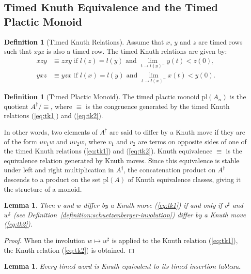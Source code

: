 \documentclass[10pt]{amsproc}
\newtheorem{lemma}[theorem]{Lemma}
\theoremstyle{definition}
\newtheorem{definition}[theorem]{Definition}
\theoremstyle{remark}
\newcommand{\pl}{\mathrm{pl}}
\begin{document}
\subsection{Timed Knuth Equivalence and the Timed Plactic Monoid}
\begin{definition}
  [Timed Knuth Relations]
  \label{sec:timed-knuth-equiv}
  Assume that $x$, $y$ and $z$ are timed rows such that $xyz$ is also a timed row.
  The timed Knuth relations are given by:
  \begin{align}
    \tag{$\kappa_1$}
    \label{eq:tk1}
    xzy & \equiv zxy \text{ if } l(z)=l(y) \text{ and } \lim_{t\to l(y)^-} y(t)<z(0),\\
    \tag{$\kappa_2$}
    \label{eq:tk2}
    yxz & \equiv yzx\text{ if } l(x)=l(y) \text{ and } \lim_{t\to l(x)^-} x(t)<y(0).
  \end{align}
\end{definition}
\begin{definition}
  [Timed Plactic Monoid]
  \label{definition:timed-plactic-monoid}
  The timed plactic monoid $\pl(A_n)$ is the quotient $A^\dagger/\equiv$, where $\equiv$ is the congruence generated by the timed Knuth relations (\ref{eq:tk1}) and (\ref{eq:tk2}).
\end{definition}
In other words, two elements of $A^\dagger$ are said to differ by a Knuth move if they are of the form $uv_1w$ and $uv_2w$, where $v_1$ and $v_2$ are terms on opposite sides of one of the timed Knuth relations (\ref{eq:tk1}) and (\ref{eq:tk2}).
Knuth equivalence $\equiv$ is the equivalence relation generated by Knuth moves.
Since this equivalence is stable under left and right multiplication in $A^\dagger$, the concatenation product on $A^\dagger$ descends to a product on the set $\pl(A)$ of Knuth equivalence classes, giving it the structure of a monoid.
\begin{lemma}
  \label{lemma:sharp-moves}
  Then $v$ and $w$ differ by a Knuth move (\ref{eq:tk1}) if and only if $v^\sharp$ and $w^\sharp$ (see Definition~\ref{definition:schuetzenberger-involution}) differ by a Knuth move (\ref{eq:tk2}).
\end{lemma}
\begin{proof}
  When the involution $w\mapsto w^\sharp$ is applied to the Knuth relation (\ref{eq:tk1}), the Knuth relation (\ref{eq:tk2}) is obtained.
\end{proof}
\begin{lemma}
  \label{lemma:reduction-to-tab}
  Every timed word is Knuth equivalent to its timed insertion tableau.
\end{lemma}
\end{document}

